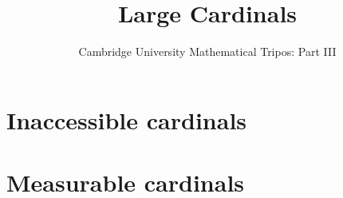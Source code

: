\documentclass{article}
\title{Large Cardinals}
\author{Cambridge University Mathematical Tripos: Part III}
\begin{document}
\maketitle

\tableofcontentsnewpage{}

\section{Inaccessible cardinals}

\section{Measurable cardinals}

\end{document}
